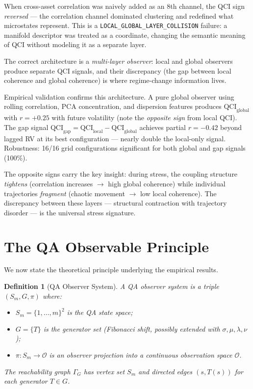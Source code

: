 \documentclass[11pt,a4paper]{article}
\newtheorem{definition}{Definition}
\begin{document}
When cross-asset correlation was naively added as an 8th channel, the QCI
sign \emph{reversed} --- the correlation channel dominated clustering and
redefined what microstates represent. This is a \texttt{LOCAL\_GLOBAL\_LAYER\_COLLISION}
failure: a manifold descriptor was treated as a coordinate, changing the
semantic meaning of QCI without modeling it as a separate layer.

The correct architecture is a \emph{multi-layer observer}: local and global
observers produce separate QCI signals, and their discrepancy (the gap
between local coherence and global coherence) is where regime-change
information lives.

Empirical validation confirms this architecture. A pure global observer
using rolling correlation, PCA concentration, and dispersion features
produces $\text{QCI}_{\text{global}}$ with $r = +0.25$ with future volatility
(note the \emph{opposite sign} from local QCI). The gap signal
$\text{QCI}_{\text{gap}} = \text{QCI}_{\text{local}} - \text{QCI}_{\text{global}}$
achieves partial $r = -0.42$ beyond lagged RV at its best configuration ---
nearly double the local-only signal. Robustness: 16/16 grid configurations
significant for both global and gap signals (100\%).

The opposite signs carry the key insight: during stress, the coupling
structure \emph{tightens} (correlation increases $\to$ high global coherence)
while individual trajectories \emph{fragment} (chaotic movement $\to$ low
local coherence). The discrepancy between these layers --- structural
contraction with trajectory disorder --- is the universal stress signature.

\section{The QA Observable Principle}
\label{sec:principle}

We now state the theoretical principle underlying the empirical results.

\begin{definition}[QA Observer System]
A \emph{QA observer system} is a triple $(S_m, G, \pi)$ where:
\begin{itemize}
  \item $S_m = \{1,\ldots,m\}^2$ is the QA state space;
  \item $G = \{T\}$ is the generator set (Fibonacci shift, possibly extended
    with $\sigma, \mu, \lambda, \nu$);
  \item $\pi: S_m \to \mathcal{O}$ is an observer projection into a
    continuous observation space $\mathcal{O}$.
\end{itemize}
The \emph{reachability graph} $\Gamma_G$ has vertex set $S_m$ and directed
edges $(s, T(s))$ for each generator $T \in G$.
\end{definition}
\end{document}
